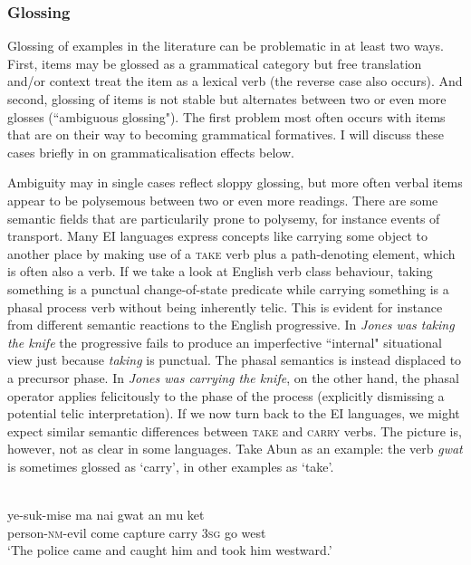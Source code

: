 \subsubsection{Glossing} \label{sec:verbglossing}

Glossing of examples in the literature can be problematic in at least two ways. First, items may be glossed as a grammatical category but free translation and/or context treat the item as a lexical verb (the reverse case also occurs). And second, glossing of items is not stable but alternates between two or even more glosses (``ambiguous glossing"). The first problem most often occurs with items that are on their way to becoming grammatical formatives. I will discuss these cases briefly in  on grammaticalisation effects below.

Ambiguity may in single cases reflect sloppy glossing, but more often verbal items appear to be polysemous between two or even more readings. There are some semantic fields that are particularily prone to polysemy, for instance events of transport. Many EI languages express concepts like carrying some object to another place by making use of a \textsc{take} verb plus a path-denoting element, which is often also a verb. If we take a look at English verb class behaviour, taking something is a punctual change-of-state predicate while carrying something is a phasal process verb without being inherently telic. This is evident for instance from different semantic reactions to the English progressive. In \textit{Jones was taking the knife} the progressive fails to produce an imperfective ``internal" situational view just because \textit{taking} is punctual. The phasal semantics is instead displaced to a precursor phase. In \textit{Jones was carrying the knife}, on the other hand, the phasal operator applies felicitously to the phase of the process (explicitly dismissing a potential telic interpretation). If we now turn back to the EI languages, we might expect similar semantic differences between \textsc{take} and \textsc{carry} verbs. The picture is, however, not as clear in some languages. Take Abun as an example: the verb \textit{gwat} is sometimes glossed as `carry', in other examples as `take'.

\ea 
{}\\
\gll ye-suk-mise ma nai gwat an mu ket \\
person-\textsc{nm}-evil come capture carry 3\textsc{sg} go west \\
\glft `The police came and caught him and took him westward.'\\ 
\z

